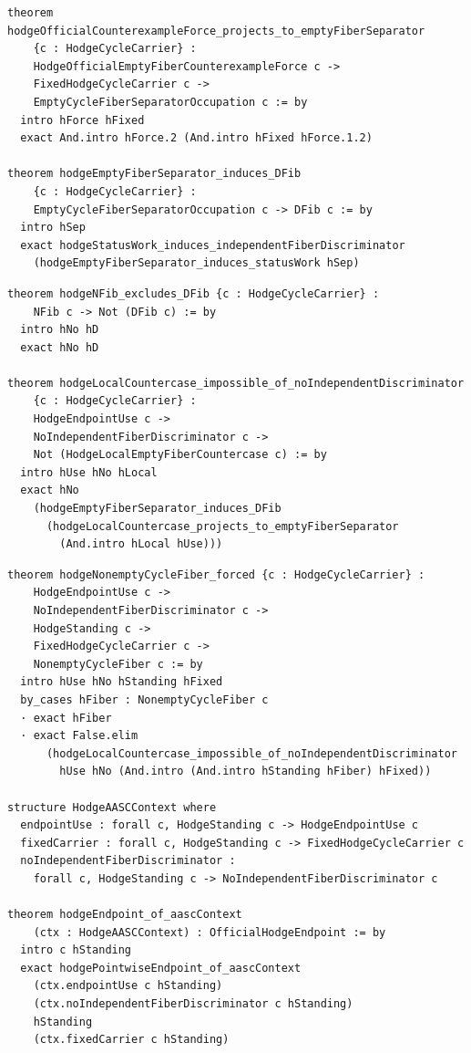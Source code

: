 \documentclass[11pt]{article}
\begin{document}
\begin{verbatim}
theorem hodgeOfficialCounterexampleForce_projects_to_emptyFiberSeparator
    {c : HodgeCycleCarrier} :
    HodgeOfficialEmptyFiberCounterexampleForce c ->
    FixedHodgeCycleCarrier c ->
    EmptyCycleFiberSeparatorOccupation c := by
  intro hForce hFixed
  exact And.intro hForce.2 (And.intro hFixed hForce.1.2)

theorem hodgeEmptyFiberSeparator_induces_DFib
    {c : HodgeCycleCarrier} :
    EmptyCycleFiberSeparatorOccupation c -> DFib c := by
  intro hSep
  exact hodgeStatusWork_induces_independentFiberDiscriminator
    (hodgeEmptyFiberSeparator_induces_statusWork hSep)
\end{verbatim}

\begin{verbatim}
theorem hodgeNFib_excludes_DFib {c : HodgeCycleCarrier} :
    NFib c -> Not (DFib c) := by
  intro hNo hD
  exact hNo hD

theorem hodgeLocalCountercase_impossible_of_noIndependentDiscriminator
    {c : HodgeCycleCarrier} :
    HodgeEndpointUse c ->
    NoIndependentFiberDiscriminator c ->
    Not (HodgeLocalEmptyFiberCountercase c) := by
  intro hUse hNo hLocal
  exact hNo
    (hodgeEmptyFiberSeparator_induces_DFib
      (hodgeLocalCountercase_projects_to_emptyFiberSeparator
        (And.intro hLocal hUse)))
\end{verbatim}

\begin{verbatim}
theorem hodgeNonemptyCycleFiber_forced {c : HodgeCycleCarrier} :
    HodgeEndpointUse c ->
    NoIndependentFiberDiscriminator c ->
    HodgeStanding c ->
    FixedHodgeCycleCarrier c ->
    NonemptyCycleFiber c := by
  intro hUse hNo hStanding hFixed
  by_cases hFiber : NonemptyCycleFiber c
  · exact hFiber
  · exact False.elim
      (hodgeLocalCountercase_impossible_of_noIndependentDiscriminator
        hUse hNo (And.intro (And.intro hStanding hFiber) hFixed))

structure HodgeAASCContext where
  endpointUse : forall c, HodgeStanding c -> HodgeEndpointUse c
  fixedCarrier : forall c, HodgeStanding c -> FixedHodgeCycleCarrier c
  noIndependentFiberDiscriminator :
    forall c, HodgeStanding c -> NoIndependentFiberDiscriminator c

theorem hodgeEndpoint_of_aascContext
    (ctx : HodgeAASCContext) : OfficialHodgeEndpoint := by
  intro c hStanding
  exact hodgePointwiseEndpoint_of_aascContext
    (ctx.endpointUse c hStanding)
    (ctx.noIndependentFiberDiscriminator c hStanding)
    hStanding
    (ctx.fixedCarrier c hStanding)
\end{verbatim}
\end{document}
